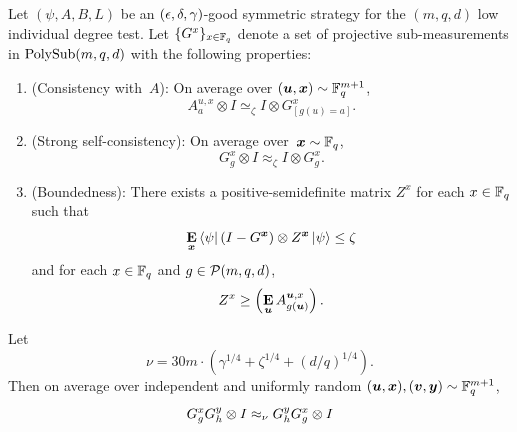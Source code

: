 \begin{theorem}[Commutativity of~$G$]\label{thm:com-main}
  Let $(\psi, A, B, L)$ be an $(\epsilon, \delta, \gamma)$-good symmetric strategy for the $(m,q,d)$ low individual degree test.
  Let $\{G^x\}_{x \in \mathbb F_q}$ denote a set of projective sub-measurements in $\mathrm{PolySub}(m, q, d)$ with the following properties:
  \begin{enumerate}
  \item (Consistency with~$A$): \label{item:commuting-consistency} On average over $(\boldsymbol{u}, {\boldsymbol{x}}) \sim \mathbb F_q^{m+1}$,
	  \begin{equation*}
	  A^{u, x}_a \otimes I \simeq_{\zeta} I \otimes G^x_{[g(u)=a]}.
	  \end{equation*}
  \item (Strong self-consistency): \label{item:commuting-self-consistency} On average over~${\boldsymbol{x}} \sim \mathbb F_q$,
  	\begin{equation*}
		G^x_g \otimes I \approx_{\zeta} I \otimes G^x_g.
	\end{equation*}
  \item (Boundedness): \label{item:commuting-boundedness} There exists a positive-semidefinite matrix $Z^x$ for each $x \in \mathbb F_q$ such that
  	\begin{equation*}
		\mathop{\bf E\/}_{{\boldsymbol{x}}} \bra{\psi} (I-G^{{\boldsymbol{x}}})\otimes Z^{{\boldsymbol{x}}} \ket{\psi} \leq \zeta
	\end{equation*}
	and for each $x \in \mathbb F_q$ and $g \in \mathcal{P}(m, q, d)$,
	\begin{equation*}
	Z^x \geq \left(\mathop{\bf E\/}_{\boldsymbol{u}} A^{\boldsymbol{u}, x}_{g(\boldsymbol{u})}\right).
	\end{equation*}
  \end{enumerate}
  Let
  \begin{equation*}
  \nu = 30m \cdot \left(\gamma^{1/4}+ \zeta^{1/4} + (d/q)^{1/4}  \right).
  \end{equation*}
  Then on average over independent and uniformly random $(\boldsymbol{u},{\boldsymbol{x}}), (\boldsymbol{v},\boldsymbol{y}) \sim \mathbb F_q^{m+1}$,
  \begin{equation*}
    G^{x}_{g} G^{y}_h \otimes I \approx_{\nu} G^y_h G^x_g \otimes I
  \end{equation*}
\end{theorem}

